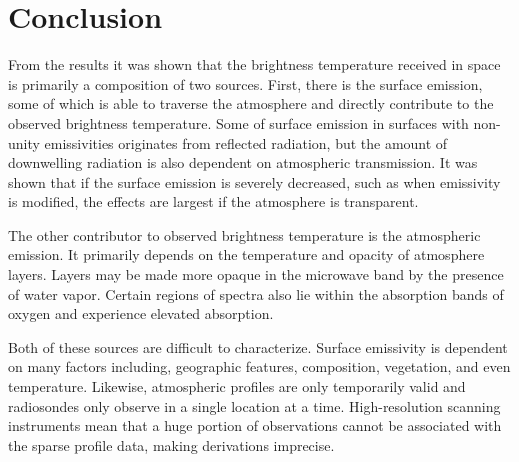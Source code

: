 \documentclass[twocol]{ametsoc}
\begin{document}
\section{Conclusion}

From the results it was shown that the brightness temperature received in space is primarily a composition of two sources.
First, there is the surface emission, some of which is able to traverse the atmosphere and directly contribute to the observed brightness temperature.
Some of surface emission in surfaces with non-unity emissivities originates from reflected radiation, but the amount of downwelling radiation is also dependent on atmospheric transmission.
It was shown that if the surface emission is severely decreased, such as when emissivity is modified, the effects are largest if the atmosphere is transparent.

The other contributor to observed brightness temperature is the atmospheric emission.
It primarily depends on the temperature and opacity of atmosphere layers.
Layers may be made more opaque in the microwave band by the presence of water vapor.
Certain regions of spectra also lie within the absorption bands of oxygen and experience elevated absorption.

Both of these sources are difficult to characterize.
Surface emissivity is dependent on many factors including, geographic features, composition, vegetation, and even temperature.
Likewise, atmospheric profiles are only temporarily valid and radiosondes only observe in a single location at a time.
High-resolution scanning instruments mean that a huge portion of observations cannot be associated with the sparse profile data, making derivations imprecise.


 
 
\end{document}
